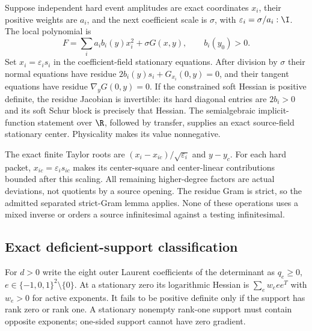 Suppose independent hard event amplitudes are exact coordinates $x_i$,
their positive weights are $a_i$, and the next coefficient scale is
$\sigma$, with $\varepsilon_i=\sigma/a_i:\I$. The local polynomial is
\[
F=\sum_i a_i b_i(y)x_i^2+\sigma G(x,y),\qquad b_i(y_0)>0.
\]
Set $x_i=\varepsilon_i s_i$ in the coefficient-field stationary
equations. After division by $\sigma$ their normal equations have
residue $2b_i(y)s_i+G_{x_i}(0,y)=0$, and their tangent equations have
residue $\nabla_yG(0,y)=0$. If the constrained soft Hessian is positive
definite, the residue Jacobian is invertible: its hard diagonal entries
are $2b_i>0$ and its soft Schur block is precisely that Hessian.
The semialgebraic implicit-function statement over $\R$, followed by
transfer, supplies an exact source-field stationary center. Physicality
makes its value nonnegative.

The exact finite Taylor roots are
$(x_i-x_{ic})/\sqrt{\varepsilon_i}$ and $y-y_c$.
For each hard packet, $x_{ic}=\varepsilon_i s_{ic}$ makes its
center-square and center-linear contributions bounded after this
scaling. All remaining higher-degree factors are actual deviations,
not quotients by a source opening. The residue Gram is strict, so the
admitted separated strict-Gram lemma applies. None of these operations
uses a mixed inverse or orders a source infinitesimal against a testing
infinitesimal.

\subsection{Exact deficient-support classification}

For $d>0$ write the eight outer Laurent coefficients of the determinant
as $q_e\ge0$, $e\in\{-1,0,1\}^2\setminus\{0\}$. At a stationary
zero its logarithmic Hessian is $\sum_e w_e ee^T$ with $w_e>0$ for
active exponents. It fails to be positive definite only if the support
has rank zero or rank one. A stationary nonempty rank-one support must
contain opposite exponents; one-sided support cannot have zero gradient.

